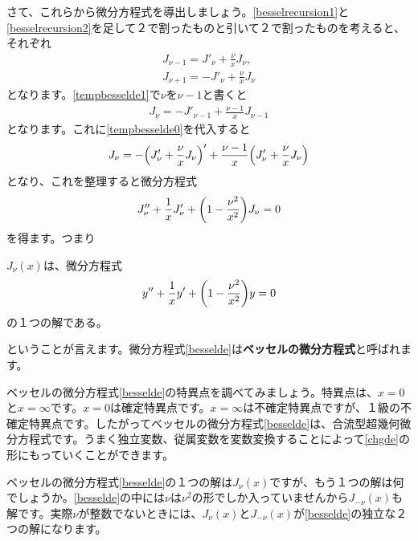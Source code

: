 \documentclass[report,paper=a4, fontsize=12pt, line_length=16cm, number_of_lines=33,dvipdfmx]{jlreq}
\newenvironment{important}{\begin{tcolorbox}[
  colback = white,
  colframe = red!35,
  boxrule = 2mm,
  fonttitle = \bfseries,
  after = \noindent] }{\end{tcolorbox}}
\numberwithin{equation}{section}
\newcommand{\strong}[1]{\textsf{\bfseries #1}}
\begin{document}
さて、これらから微分方程式を導出しましょう。\eqref{besselrecursion1}と\eqref{besselrecursion2}を足して２で割ったものと引いて２で割ったものを考えると、それぞれ
\begin{align}
  J_{\nu-1}=J'_{\nu}+\frac{\nu}{x}J_{\nu},\label{tempbesselde0}\\
  J_{\nu+1}=-J'_{\nu}+\frac{\nu}{x}J_{\nu}\label{tempbesselde1}
\end{align}
となります。\eqref{tempbesselde1}で$\nu$を$\nu-1$と書くと
\begin{align}
  J_{\nu}=-J'_{\nu-1}+\frac{\nu-1}{x}J_{\nu-1}
\end{align}
となります。これに\eqref{tempbesselde0}を代入すると
\begin{align}
  J_{\nu}=-\qty(J'_{\nu}+\frac{\nu}{x}J_{\nu})'
  +\frac{\nu-1}{x}\qty(J'_{\nu}+\frac{\nu}{x}J_{\nu})
\end{align}
となり、これを整理すると微分方程式
\begin{align}
  J''_{\nu}+\frac{1}{x}J'_{\nu}+\qty(1-\frac{\nu^2}{x^2})J_{\nu}=0
\end{align}
を得ます。つまり
\begin{important}
  $J_{\nu}(x)$は、微分方程式
  \begin{align}
    y''+\frac{1}{x}y'+\qty(1-\frac{\nu^2}{x^2})y=0
    \label{besselde}
  \end{align}
  の１つの解である。
\end{important}
ということが言えます。微分方程式\eqref{besselde}は\strong{ベッセルの微分方程式}と呼ばれます。

ベッセルの微分方程式\eqref{besselde}の特異点を調べてみましょう。特異点は、$x=0$と$x=\infty$です。$x=0$は確定特異点です。$x=\infty$は不確定特異点ですが、１級の不確定特異点です。したがってベッセルの微分方程式\eqref{besselde}は、合流型超幾何微分方程式です。うまく独立変数、従属変数を変数変換することによって\eqref{chgde}の形にもっていくことができます。

ベッセルの微分方程式\eqref{besselde}の１つの解は$J_{\nu}(x)$ですが、もう１つの解は何でしょうか。\eqref{besselde}の中には$\nu$は$\nu^2$の形でしか入っていませんから$J_{-\nu}(x)$も解です。実際$\nu$が整数でないときには、$J_{\nu}(x)$と$J_{-\nu}(x)$が\eqref{besselde}の独立な２つの解になります。
\end{document}
